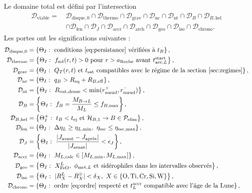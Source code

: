 \documentclass[11pt,a4paper,openany]{report}
\newcommand{\Req}{R_{\mathrm{eq}}}
\newcommand{\aR}{a_{\mathrm{Roche}}}
\begin{document}
Le domaine total est défini par l'intersection
\begin{equation}
\boxed{\begin{aligned}
\mathcal{D}_{\mathrm{viable}}=\ &\mathcal{D}_{\mathrm{disque},0}\cap\mathcal{D}_{\mathrm{thermo}}
\cap\mathcal{D}_{\mathrm{grav}}\cap\mathcal{D}_{\mathrm{nc}}\cap\mathcal{D}_{\mathrm{nt}}
\cap\mathcal{D}_{B}\cap\mathcal{D}_{B,\mathrm{hel}}\\
&\cap\mathcal{D}_{\mathrm{fen}}\cap\mathcal{D}_{J}\cap\mathcal{D}_{\mathrm{accr}}\cap\mathcal{D}_{\mathrm{arch}}
\cap\mathcal{D}_{\mathrm{geo}}\cap\mathcal{D}_{\mathrm{iso}}\cap\mathcal{D}_{\mathrm{chrono}}.
\end{aligned}}
\label{eq:Dviable}
\end{equation}
Les portes ont les significations suivantes :
\begin{align}
\mathcal{D}_{\mathrm{disque},0}&=\left\{\Theta_I:\ \text{conditions~\eqref{eq:persistance} vérifiées à }t_B\right\},
\label{eq:Ddisque}\\
\mathcal{D}_{\mathrm{thermo}}&=\left\{\Theta_I:\ f_{\mathrm{sol}}(r,t)>0\ \text{pour }r>\aR\ \text{avant }
t^{\mathrm{start}}_{\mathrm{acc},L}\right\},
\label{eq:Dthermo}\\
\mathcal{D}_{\mathrm{grav}}&=\left\{\Theta_I:\ Q_T(r,t)\ \text{et}\ t_{\mathrm{sat}}\ \text{compatibles avec le régime de la section~\ref{sec:regimes}}\right\},
\label{eq:Dgrav}\\
\mathcal{D}_{\mathrm{nc}}&=\left\{\Theta_I:\ q_B>\Req+R_{B,\mathrm{eff}}\right\},
\label{eq:Dnc}\\
\mathcal{D}_{\mathrm{nt}}&=\left\{\Theta_I:\ R_{\mathrm{out,dense}}<\min(r^{+}_{\text{nœud}},r^{-}_{\text{nœud}})\right\},
\label{eq:Dnt}\\
\mathcal{D}_{B}&=\left\{\Theta_I:\ f_B=\frac{M_{B\to L}}{M_L}\le f_{B,\max}\right\},
\label{eq:DB}\\
\mathcal{D}_{B,\mathrm{hel}}&=\left\{\Theta_I^{+}:\ t_B<t_{\mathrm{ej}}
\text{ et }\mathcal{H}_{B,1}\to B\in\mathcal{P}_{\mathrm{elim}}\right\},
\label{eq:DBhel}\\
\mathcal{D}_{\mathrm{fen}}&=\left\{\Theta_I:\ \Delta\eta_L\ge\eta_{L,\min},\ \eta_{\mathrm{esc}}\le\eta_{\mathrm{esc},\max}\right\},
\label{eq:Dfen}\\
\mathcal{D}_{J}&=\left\{\Theta_I:\ \frac{|J_{\mathrm{avant}}-J_{\text{après}}|}{|J_{\mathrm{avant}}|}<\epsilon_J\right\},
\label{eq:DJ}\\
\mathcal{D}_{\mathrm{accr}}&=\left\{\Theta_I:\ M_{L,\mathrm{calc}}\in[M_{L,\min},M_{L,\max}]\right\},
\label{eq:Daccr}\\
\mathcal{D}_{\mathrm{geo}}&=\left\{\Theta_I:\ X^L_{\mathrm{FeO}},\ \phi_{\mathrm{met},L}\ \text{et sidérophiles dans les intervalles observés}\right\},
\label{eq:Dgeo}\\
\mathcal{D}_{\mathrm{iso}}&=\left\{\Theta_I:\ |R_X^L-R_X^\oplus|<\delta_X,\ X\in\{\mathrm{O},\mathrm{Ti},\mathrm{Cr},\mathrm{Si},\mathrm{W}\}\right\},
\label{eq:Diso}\\
\mathcal{D}_{\mathrm{chrono}}&=\left\{\Theta_I:\ \text{ordre~\eqref{eq:ordre} respecté et }
t^{\mathrm{accr}}_L\ \text{compatible avec l'âge de la Lune}\right\},
\label{eq:Dchrono}
\end{align}
\end{document}
